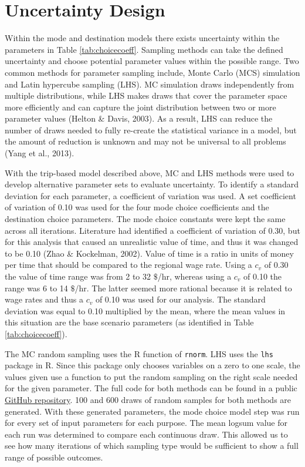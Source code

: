 \documentclass[fancy, masters, twoside]{byuthesis}
\begin{document}
\hypertarget{uncertainty-design}{%
\section{Uncertainty Design}\label{uncertainty-design}}

Within the mode and destination models there exists uncertainty within the parameters in Table \ref{tab:choicecoeff}. Sampling methods can take the defined uncertainty and choose potential parameter values within the possible range. Two common methods for parameter sampling include, Monte Carlo (MCS) simulation and Latin hypercube sampling (LHS). MC simulation draws independently from multiple distributions, while LHS makes draws that cover the parameter space more efficiently and can capture the joint distribution between two or more parameter values (Helton \& Davis, 2003). As a result, LHS can reduce the number of draws needed to fully re-create the statistical variance in a model, but the amount of reduction is unknown and may not be universal to all problems (Yang et al., 2013).

With the trip-based model described above, MC and LHS methods were used to develop alternative parameter sets to evaluate uncertainty. To identify a standard deviation for each parameter, a coefficient of variation was used. A set coefficient of variation of 0.10 was used for the four mode choice coefficients and the destination choice parameters. The mode choice constants were kept the same across all iterations. Literature had identified a coefficient of variation of 0.30, but for this analysis that caused an unrealistic value of time, and thus it was changed to be 0.10 (Zhao \& Kockelman, 2002). Value of time is a ratio in units of money per time that should be compared to the regional wage rate. Using a \(c_v\) of 0.30 the value of time range was from 2 to 32 \(\$\)/hr, whereas using a \(c_v\) of 0.10 the range was 6 to 14 \(\$\)/hr. The latter seemed more rational because it is related to wage rates and thus a \(c_v\) of 0.10 was used for our analysis. The standard deviation was equal to 0.10 multiplied by the mean, where the mean values in this situation are the base scenario parameters (as identified in Table \ref{tab:choicecoeff}).

The MC random sampling uses the R function of \texttt{rnorm}. LHS uses the \texttt{lhs} package in R. Since this package only chooses variables on a zero to one scale, the values given use a function to put the random sampling on the right scale needed for the given parameter. The full code for both methods can be found in a public \href{https://github.com/natmaegray/sensitivity_thesis}{GitHub repository}. 100 and 600 draws of random samples for both methods are generated. With these generated parameters, the mode choice model step was run for every set of input parameters for each purpose. The mean logsum value for each run was determined to compare each continuous draw. This allowed us to see how many iterations of which sampling type would be sufficient to show a full range of possible outcomes.
\end{document}
